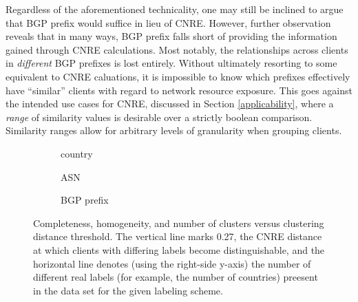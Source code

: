 Regardless of the aforementioned technicality, one may still be inclined to
argue that BGP prefix would suffice in lieu of CNRE. However, further
observation reveals that in many ways, BGP prefix falls short of providing the
information gained through CNRE calculations. Most notably, the relationships
across clients in \emph{different} BGP prefixes is lost entirely. Without
ultimately resorting to some equivalent to CNRE caluations, it is impossible to
know which prefixes effectively have ``similar'' clients with regard to network
resource exposure. This goes against the intended use cases for CNRE, discussed
in Section \ref{applicability}, where a \emph{range} of similarity values is
desirable over a strictly boolean comparison. Similarity ranges allow for
arbitrary levels of granularity when grouping clients.

\begin{figure}
    \center
            \begin{subfigure}[b]{0.8\linewidth}
                \caption{country} 
            \end{subfigure}
            \begin{subfigure}[b]{0.8\linewidth}
                \caption{ASN} 
            \end{subfigure}
            \begin{subfigure}[b]{0.8\linewidth}
                \caption{BGP prefix} 
                \label{fig:chbgp}
            \end{subfigure}
    \caption{Completeness, homogeneity, and number of clusters versus clustering
    distance threshold. The vertical line marks 0.27, the CNRE distance at which
    clients with differing labels become distinguishable, and the horizontal
    line denotes (using the right-side y-axis) the number of different real labels
    (for example, the number of countries) preesent in the data set for the
    given labeling scheme.}
    \label{fig:ch}
\end{figure}


